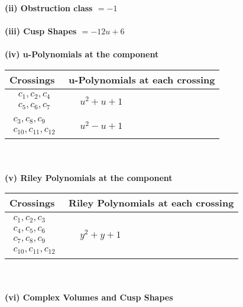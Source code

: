 \documentclass[1p]{elsarticle_modified}
\theoremstyle{definition}
\begin{document}
\flushleft \textbf{(ii) Obstruction class $= -1$}\\~\\
\flushleft \textbf{(iii) Cusp Shapes $= -12 u+6$}\\~\\
\newpage\renewcommand{\arraystretch}{1}
\flushleft \textbf{(iv) u-Polynomials at the component}\newline \\
\begin{tabular}{m{50pt}|m{274pt}}
Crossings & \hspace{64pt}u-Polynomials at each crossing \\
\hline $$\begin{aligned}c_{1},c_{2},c_{4}\\c_{5},c_{6},c_{7}\end{aligned}$$&$\begin{aligned}
&u^2+u+1
\end{aligned}$\\
\hline $$\begin{aligned}c_{3},c_{8},c_{9}\\c_{10},c_{11},c_{12}\end{aligned}$$&$\begin{aligned}
&u^2- u+1
\end{aligned}$\\
\hline
\end{tabular}\\~\\
\newpage\renewcommand{\arraystretch}{1}
\flushleft \textbf{(v) Riley Polynomials at the component}\newline \\
\begin{tabular}{m{50pt}|m{274pt}}
Crossings & \hspace{64pt}Riley Polynomials at each crossing \\
\hline $$\begin{aligned}c_{1},c_{2},c_{3}\\c_{4},c_{5},c_{6}\\c_{7},c_{8},c_{9}\\c_{10},c_{11},c_{12}\end{aligned}$$&$\begin{aligned}
&y^2+y+1
\end{aligned}$\\
\hline
\end{tabular}\\~\\
\newpage\flushleft \textbf{(vi) Complex Volumes and Cusp Shapes}
\end{document}
